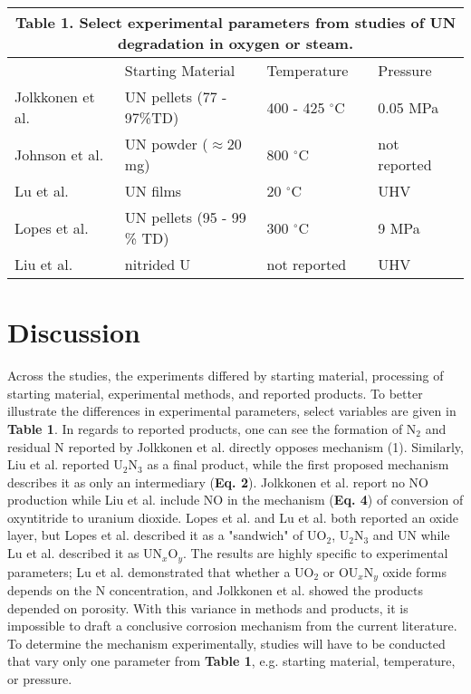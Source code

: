 \documentclass[11pt]{article}
\begin{document}
\begin{multicols}{2}
\begin{table*}[!t]
\begin{tabular}{ p{3.5cm} p{5cm} p{2.5cm} p{2.5cm}  }
		\multicolumn{4}{c}{\textbf{Table 1.} Select experimental parameters from studies of UN degradation in oxygen or steam.} \\
		\hline
		& Starting Material &Temperature & Pressure\\
		\hline
		Jolkkonen et al. \cite{Jolkkonen2017}   &  UN pellets (77 - 97\%TD) &400 - 425 $^{\circ}$C&  0.05 MPa \\
		Johnson et al. \cite{Johnson2016}   & UN powder ($\approx$20 mg)     &800 $^{\circ}$C&  not reported \\
		Lu et al. \cite{Lu2016}  & UN films    &20 $^{\circ}$C&   UHV \\
		Lopes et al. \cite{Lopes2017}   & UN pellets (95 - 99 \% TD)    & 300 $^{\circ}$C&   9 MPa \\
		Liu et al. & nitrided U & not reported  & UHV\\
		\hline
	\end{tabular}
\end{table*}
\section{Discussion}

\par Across the studies, the experiments differed by starting material, processing of starting material, experimental methods, and reported products. To better illustrate the differences in experimental parameters, select variables are given in \textbf{Table 1}. In regards to reported products, one can see the formation of N$_{2}$ and residual N reported by Jolkkonen et al. \cite{Jolkkonen2017} directly opposes mechanism (1). Similarly, Liu et al. \cite{Liu2013} reported U$_{2}$N$_{3}$ as a final product, while the first proposed mechanism describes it as only an intermediary (\textbf{Eq. 2}). Jolkkonen et al. report no NO production while Liu et al. include NO in the mechanism (\textbf{Eq. 4}) of conversion of oxyntitride to uranium dioxide. Lopes et al. and Lu et al. both reported an oxide layer, but Lopes et al. described it as a "sandwich" of UO$_{2}$, U$_{2}$N$_{3}$ and UN while Lu et al. described it as UN$_{x}$O$_{y}$.
 The results are highly specific to experimental parameters; Lu et al. demonstrated that whether a UO$_{2}$ or  OU$_{x}$N$_{y}$ oxide forms depends on the N concentration, and Jolkkonen et al. showed the products depended on porosity. With this variance in methods and products, it is impossible to draft a conclusive corrosion mechanism from the current literature. To determine the mechanism experimentally, studies will have to be conducted that vary only one parameter from \textbf{Table 1}, e.g. starting material, temperature, or pressure.


\end{multicols}
\end{document}
